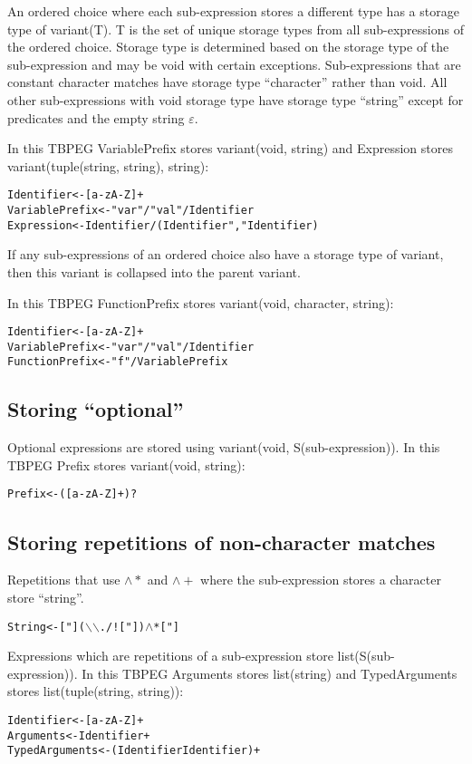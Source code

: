 \documentclass[a4paper,11pt]{article}
\begin{document}
An ordered choice where each sub-expression stores a different type has a storage type of variant(T).
T is the set of unique storage types from all sub-expressions of the ordered choice.
Storage type is determined based on the storage type of the sub-expression and may be void with certain exceptions.
Sub-expressions that are constant character matches have storage type ``character'' rather than void.
All other sub-expressions with void storage type have storage type ``string'' except for predicates and the empty string $\varepsilon$.

In this TBPEG VariablePrefix stores variant(void, string) and Expression stores variant(tuple(string, string), string):
\begin{alltt}
    Identifier     <- [a-zA-Z]+
    VariablePrefix <- "var" / "val" / Identifier
    Expression     <- Identifier / (Identifier "," Identifier)
\end{alltt}

If any sub-expressions of an ordered choice also have a storage type of variant, then this variant is collapsed into the parent variant.

In this TBPEG FunctionPrefix stores variant(void, character, string):
\begin{alltt}
    Identifier     <- [a-zA-Z]+
    VariablePrefix <- "var" / "val" / Identifier
    FunctionPrefix <- "f" / VariablePrefix
\end{alltt}

\subsection{Storing ``optional''}
Optional expressions are stored using variant(void, S(sub-expression)).
In this TBPEG Prefix stores variant(void, string):
\begin{alltt}
    Prefix <- ([a-zA-Z]+)?
\end{alltt}

\subsection{Storing repetitions of non-character matches}
Repetitions that use $\wedge *$ and $\wedge +$ where the sub-expression stores a character store ``string''.
\begin{alltt}
    String <- ["] (\(\backslash\)\(\backslash\) . / ! ["] )\(\wedge\)* ["]
\end{alltt}

Expressions which are repetitions of a sub-expression store list(S(sub-expression)).
In this TBPEG Arguments stores list(string) and TypedArguments stores list(tuple(string, string)):
\begin{alltt}
    Identifier     <- [a-zA-Z]+
    Arguments      <- Identifier+
    TypedArguments <- (Identifier Identifier)+
\end{alltt}
\end{document}

